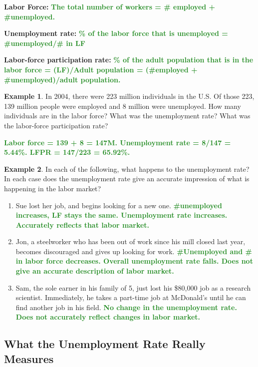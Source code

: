 \documentclass[11pt]{article}\usepackage[]{graphicx}\usepackage[]{color}
\theoremstyle{definition}
\newtheorem{exmp}{Example}[section]
\newcommand{\blank}[1]{}
\newcommand{\ddp}[1]{{\textbf{\textcolor{ForestGreen}{#1}}}}
\newcommand{\defn}[1]{\textbf{#1}}
\begin{document}
\defn{Labor Force:} \ddp{The total number of workers = \# employed + \#unemployed.\\}

\defn{Unemployment rate:} \ddp{\% of the labor force that is unemployed = \#unemployed/\# in LF\\}

\defn{Labor-force participation rate:} \ddp{\% of the adult population that is in the labor force = (LF)/Adult population = (\#employed + \#unemployed)/adult population.}

\begin{exmp} 
	In 2004, there were 223 million individuals in the U.S. Of those 223, 139 million people were employed and 8 million were unemployed. How many individuals are in the labor force? What was the unemployment rate? What was the labor-force participation rate?
\end{exmp}
\ddp{Labor force = 139 + 8 = 147M. Unemployment rate = 8/147 = 5.44\%. LFPR = 147/223 = 65.92\%.}
\blank{}

\begin{exmp} 
In each of the following, what happens to the unemployment rate? In each case does the unemployment rate give an accurate impression of what is happening in the labor market?
\begin{enumerate}
	\setlength{\itemsep}{1em}
	\item Sue lost her job, and begins looking for a new one. \ddp{\#unemployed increases, LF stays the same. Unemployment rate increases. Accurately reflects that labor market.}
	\item Jon, a steelworker who has been out of work since his mill closed last year, becomes discouraged and gives up looking for work. \ddp{\#Unemployed and \# in labor force decreases. Overall unemployment rate falls. Does not give an accurate description of labor market.}
	\item Sam, the sole earner in his family of 5, just lost his \$80,000 job as a research scientist. Immediately, he takes a part-time job at McDonald's until he can find another job in his field. \ddp{No change in the unemployment rate. Does not accurately reflect changes in labor market.}
\end{enumerate}
\end{exmp}

\subsection{What the Unemployment Rate Really Measures}
\end{document}
